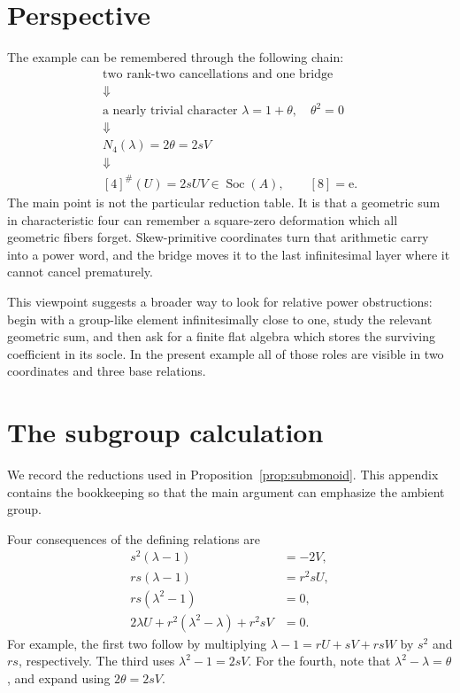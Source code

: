 \documentclass[11pt]{amsart}
\theoremstyle{definition}
\theoremstyle{remark}
\newcommand{\Soc}{\operatorname{Soc}}
\newcommand{\unit}{\mathrm e}
\begin{document}
\section{Perspective}

The example can be remembered through the following chain:
\[
 \boxed{
 \begin{gathered}
 \text{two rank-two cancellations and one bridge}\\
 \Downarrow\\
 \text{a nearly trivial character }\lambda=1+\theta,
 \quad\theta^2=0\\
 \Downarrow\\
 N_4(\lambda)=2\theta=2sV\\
 \Downarrow\\
 [4]^\#(U)=2sUV\in\Soc(A),\qquad [8]=\unit.
 \end{gathered}}
\]
The main point is not the particular reduction table.  It is that a
geometric sum in characteristic four can remember a square-zero
deformation which all geometric fibers forget.  Skew-primitive coordinates
turn that arithmetic carry into a power word, and the bridge moves it to
the last infinitesimal layer where it cannot cancel prematurely.

This viewpoint suggests a broader way to look for relative power
obstructions: begin with a group-like element infinitesimally close to one,
study the relevant geometric sum, and then ask for a finite flat algebra
which stores the surviving coefficient in its socle.  In the present
example all of those roles are visible in two coordinates and three base
relations.

\appendix

\section{The subgroup calculation}\label{app:closure}

We record the reductions used in Proposition~\ref{prop:submonoid}.  This
appendix contains the bookkeeping so that the main argument can emphasize
the ambient group.

Four consequences of the defining relations are
\begin{align}
 s^2(\lambda-1)&=-2V,\label{eq:aux-1}\\
 rs(\lambda-1)&=r^2sU,\label{eq:aux-2}\\
 rs(\lambda^2-1)&=0,\label{eq:aux-3}\\
 2\lambda U+r^2(\lambda^2-\lambda)+r^2sV&=0.
 \label{eq:aux-4}
\end{align}
For example, the first two follow by multiplying
\(\lambda-1=rU+sV+rsW\) by \(s^2\) and \(rs\), respectively.  The third
uses \(\lambda^2-1=2sV\).  For the fourth, note that
\(\lambda^2-\lambda=\theta\), and expand using \(2\theta=2sV\).
\end{document}
